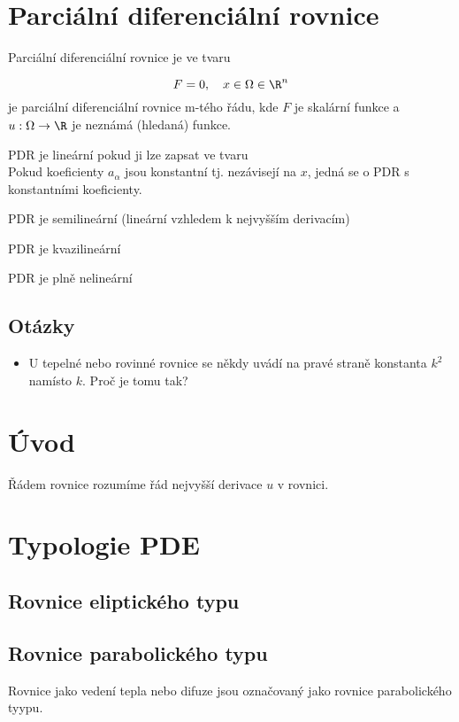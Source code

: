 \section{Parciální diferenciální rovnice}

Parciální diferenciální rovnice je ve tvaru 

\begin{definition}
$$
F = 0, \quad x \in \Omega \in \R^n
$$
je parciální diferenciální rovnice m-tého řádu, kde $F$ je skalární funkce a $u : \Omega \rightarrow{\R}$ je neznámá (hledaná) funkce.
\end{definition}

PDR je lineární pokud ji lze zapsat ve tvaru 
$$
$$
Pokud koeficienty $a_{\alpha}$ jsou konstantní tj. nezávisejí na $x$, jedná se o PDR s konstantními koeficienty.


PDR je semilineární (lineární vzhledem k nejvyšším derivacím)

PDR je kvazilineární

PDR je plně nelineární

\subsection{Otázky}
\begin{itemize}
    \item U tepelné nebo rovinné rovnice se někdy uvádí na pravé straně konstanta $k^2$ namísto $k$. Proč je tomu tak? 
\end{itemize}

\section{Úvod}

Řádem rovnice rozumíme řád nejvyšší derivace $u$ v rovnici.

\section{Typologie PDE}

\subsection{Rovnice eliptického typu}
\subsection{Rovnice parabolického typu}
Rovnice jako vedení tepla nebo difuze jsou označovaný jako rovnice parabolického tyypu.
